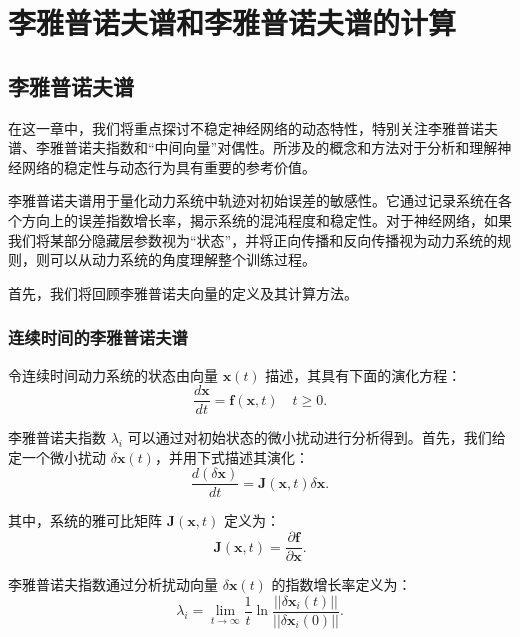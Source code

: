 
\chapter{李雅普诺夫谱和李雅普诺夫谱的计算}

\section{李雅普诺夫谱}

在这一章中，我们将重点探讨不稳定神经网络的动态特性，特别关注李雅普诺夫谱、李雅普诺夫指数和“中间向量”对偶性。所涉及的概念和方法对于分析和理解神经网络的稳定性与动态行为具有重要的参考价值。

李雅普诺夫谱用于量化动力系统中轨迹对初始误差的敏感性。它通过记录系统在各个方向上的误差指数增长率，揭示系统的混沌程度和稳定性。对于神经网络，如果我们将某部分隐藏层参数视为“状态”，并将正向传播和反向传播视为动力系统的规则，则可以从动力系统的角度理解整个训练过程。

首先，我们将回顾李雅普诺夫向量的定义及其计算方法。

\subsection{连续时间的李雅普诺夫谱}

令连续时间动力系统的状态由向量 \(\mathbf{x}(t)\) 描述，其具有下面的演化方程：
\begin{equation}
      \frac{d\mathbf{x}}{dt} = \mathbf{f}(\mathbf{x}, t) \quad t\geq 0.
\end{equation}

李雅普诺夫指数 \(\lambda_i\) 可以通过对初始状态的微小扰动进行分析得到。首先，我们给定一个微小扰动 \(\delta \mathbf{x}(t)\)，并用下式描述其演化：
\begin{equation}
      \frac{d (\delta \mathbf{x})}{dt} = \mathbf{J}(\mathbf{x}, t) \delta \mathbf{x}.
\end{equation}

其中，系统的雅可比矩阵 \(\mathbf{J}(\mathbf{x}, t)\) 定义为：
\begin{equation}
      \mathbf{J}(\mathbf{x}, t) = \frac{\partial \mathbf{f}}{\partial \mathbf{x}}.
\end{equation}

李雅普诺夫指数通过分析扰动向量 \(\delta \mathbf{x}(t)\) 的指数增长率定义为：
\begin{equation}
      \lambda_i = \lim_{t \to \infty} \frac{1}{t} \ln \frac{||\delta \mathbf{x}_i(t)||}{||\delta \mathbf{x}_i(0)||}.
\end{equation}

